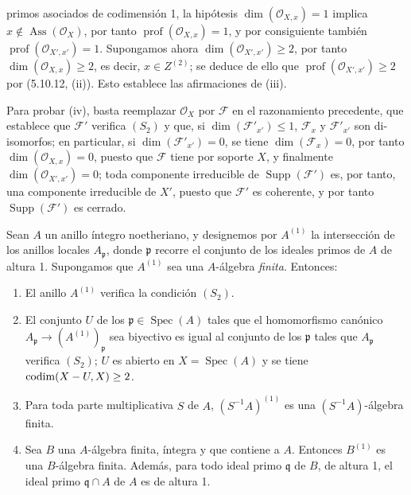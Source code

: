 
primos asociados de codimensión 1, la hipótesis
$\dim(\mathcal O_{X,x})=1$ implica $x\notin\operatorname{Ass}(\mathcal O_X)$,
por tanto $\operatorname{prof}(\mathcal O_{X,x})=1$, y por consiguiente
también $\operatorname{prof}(\mathcal O_{X',x'})=1$. Supongamos ahora
$\dim(\mathcal O_{X',x'})\geq2$, por tanto
$\dim(\mathcal O_{X,x})\geq2$, es decir, $x\in Z^{(2)}$; se deduce de ello que
$\operatorname{prof}(\mathcal O_{X',x'})\geq2$ por (5.10.12, (ii)). Esto
establece las afirmaciones de (iii).

Para probar (iv), basta reemplazar $\mathcal O_X$ por $\mathcal F$ en el
razonamiento precedente, que establece que $\mathcal F'$ verifica $(S_2)$ y
que, si $\dim(\mathcal F'_{x'})\leq1$, $\mathcal F_x$ y
$\mathcal F'_{x'}$ son di-isomorfos; en particular, si
$\dim(\mathcal F'_{x'})=0$, se tiene $\dim(\mathcal F_x)=0$, por tanto
$\dim(\mathcal O_{X,x})=0$, puesto que $\mathcal F$ tiene por soporte $X$, y
finalmente $\dim(\mathcal O_{X',x'})=0$; toda componente irreducible de
$\operatorname{Supp}(\mathcal F')$ es, por tanto, una componente irreducible
de $X'$, puesto que $\mathcal F'$ es coherente, y por tanto
$\operatorname{Supp}(\mathcal F')$ es cerrado.

\begin{proposition}[5.10.17]
\label{IV.2.s5.10.17-fr}
Sean $A$ un anillo íntegro noetheriano, y designemos por $A^{(1)}$ la
intersección de los anillos locales $A_{\mathfrak p}$, donde $\mathfrak p$
recorre el conjunto de los ideales primos de $A$ de altura 1. Supongamos que
$A^{(1)}$ sea una $A$-álgebra \emph{finita}. Entonces:
\begin{enumerate}
\item[\textup{(i)}] El anillo $A^{(1)}$ verifica la condición $(S_2)$.
\item[\textup{(ii)}] El conjunto $U$ de los $\mathfrak p\in\operatorname{Spec}(A)$
tales que el homomorfismo canónico
$A_{\mathfrak p}\to(A^{(1)})_{\mathfrak p}$ sea biyectivo es igual al
conjunto de los $\mathfrak p$ tales que $A_{\mathfrak p}$ verifica $(S_2)$;
$U$ es abierto en $X=\operatorname{Spec}(A)$ y se tiene
$\operatorname{codim}(X- U,X)\geq2$.
\item[\textup{(iii)}] Para toda parte multiplicativa $S$ de $A$, $(S^{-1}A)^{(1)}$ es
una $(S^{-1}A)$-álgebra finita.
\item[\textup{(iv)}] Sea $B$ una $A$-álgebra finita, íntegra y que contiene a $A$.
Entonces $B^{(1)}$ es una $B$-álgebra finita. Además, para todo ideal primo
$\mathfrak q$ de $B$, de altura 1, el ideal primo $\mathfrak q\cap A$ de $A$
es de altura 1.
\end{enumerate}
\end{proposition}


